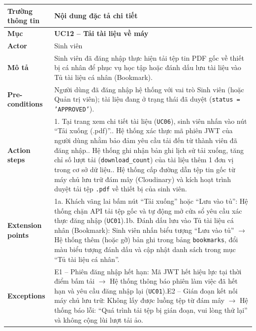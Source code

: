 \begin{table}[H]
\centering
\footnotesize\linespread{1.05}\selectfont
\setlength{\tabcolsep}{5pt}
\renewcommand{\arraystretch}{1.12}
\begin{tabularx}{\textwidth}{|p{3.5cm}|X|}
\hline
\rowcolor[HTML]{EAEAEA}
\textbf{Trường thông tin} & \textbf{Nội dung đặc tả chi tiết} \\
\hline
\textbf{Mục} & \textbf{UC12 -- Tải tài liệu về máy} \\
\hline
\textbf{Actor} & Sinh viên \\
\hline
\textbf{Mô tả} & Sinh viên đã đăng nhập thực hiện tải tệp tin PDF gốc về thiết bị cá nhân để phục vụ học tập hoặc đánh dấu lưu tài liệu vào Tủ tài liệu cá nhân (Bookmark). \\
\hline
\textbf{Pre-conditions} & Người dùng đã đăng nhập hệ thống với vai trò Sinh viên (hoặc Quản trị viên); tài liệu đang ở trạng thái đã duyệt (\texttt{status = 'APPROVED'}). \\
\hline
\textbf{Action steps} & 1. Tại trang xem chi tiết tài liệu (\texttt{UC06}), sinh viên nhấn vào nút ``Tải xuống (.pdf)''.\newline 2. Hệ thống xác thực mã phiên JWT của người dùng nhằm bảo đảm yêu cầu tải đến từ thành viên đã đăng nhập.\newline 3. Hệ thống ghi nhận bản ghi lịch sử tải xuống, tăng chỉ số lượt tải (\texttt{download\_count}) của tài liệu thêm 1 đơn vị trong cơ sở dữ liệu.\newline 4. Hệ thống cấp đường dẫn tệp tin gốc từ máy chủ lưu trữ đám mây (Cloudinary) và kích hoạt trình duyệt tải tệp \texttt{.pdf} về thiết bị của sinh viên. \\
\hline
\textbf{Extension points} & 1a. Khách vãng lai bấm nút ``Tải xuống'' hoặc ``Lưu vào tủ'': Hệ thống chặn API tải tệp gốc và tự động mở cửa sổ yêu cầu xác thực đăng nhập (\texttt{UC01}).\newline 1b. Đánh dấu lưu vào Tủ tài liệu cá nhân (Bookmark): Sinh viên nhấn biểu tượng ``Lưu vào tủ'' $\rightarrow$ Hệ thống thêm (hoặc gỡ) bản ghi trong bảng \texttt{bookmarks}, đổi màu biểu tượng đánh dấu và cập nhật danh sách trong mục ``Tủ tài liệu cá nhân''. \\
\hline
\textbf{Exceptions} & E1 -- Phiên đăng nhập hết hạn: Mã JWT hết hiệu lực tại thời điểm bấm tải $\rightarrow$ Hệ thống thông báo phiên làm việc đã hết hạn và yêu cầu đăng nhập lại (\texttt{UC01}).\newline E2 -- Gián đoạn kết nối máy chủ lưu trữ: Không lấy được luồng tệp từ đám mây $\rightarrow$ Hệ thống báo lỗi: ``Quá trình tải tệp bị gián đoạn, vui lòng thử lại'' và không cộng lùi lượt tải ảo. \\

\end{tabularx}
\end{table}
